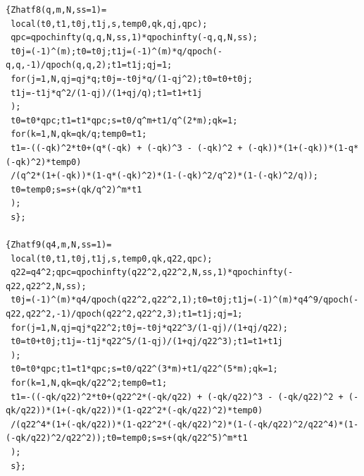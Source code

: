 \documentclass[pdftex]{sigma}
\numberwithin{equation}{section}
\begin{document}
\begin{lstlisting}
{Zhatf8(q,m,N,ss=1)=
 local(t0,t1,t0j,t1j,s,temp0,qk,qj,qpc);
 qpc=qpochinfty(q,q,N,ss,1)*qpochinfty(-q,q,N,ss);
 t0j=(-1)^(m);t0=t0j;t1j=(-1)^(m)*q/qpoch(-q,q,-1)/qpoch(q,q,2);t1=t1j;qj=1;
 for(j=1,N,qj=qj*q;t0j=-t0j*q/(1-qj^2);t0=t0+t0j;
 t1j=-t1j*q^2/(1-qj)/(1+qj/q);t1=t1+t1j
 );
 t0=t0*qpc;t1=t1*qpc;s=t0/q^m+t1/q^(2*m);qk=1;
 for(k=1,N,qk=qk/q;temp0=t1;
 t1=-((-qk)^2*t0+(q*(-qk) + (-qk)^3 - (-qk)^2 + (-qk))*(1+(-qk))*(1-q*(-qk)^2)*temp0)
 /(q^2*(1+(-qk))*(1-q*(-qk)^2)*(1-(-qk)^2/q^2)*(1-(-qk)^2/q));
 t0=temp0;s=s+(qk/q^2)^m*t1
 );
 s};

{Zhatf9(q4,m,N,ss=1)=
 local(t0,t1,t0j,t1j,s,temp0,qk,q22,qpc);
 q22=q4^2;qpc=qpochinfty(q22^2,q22^2,N,ss,1)*qpochinfty(-q22,q22^2,N,ss);
 t0j=(-1)^(m)*q4/qpoch(q22^2,q22^2,1);t0=t0j;t1j=(-1)^(m)*q4^9/qpoch(-q22,q22^2,-1)/qpoch(q22^2,q22^2,3);t1=t1j;qj=1;
 for(j=1,N,qj=qj*q22^2;t0j=-t0j*q22^3/(1-qj)/(1+qj/q22);
 t0=t0+t0j;t1j=-t1j*q22^5/(1-qj)/(1+qj/q22^3);t1=t1+t1j
 );
 t0=t0*qpc;t1=t1*qpc;s=t0/q22^(3*m)+t1/q22^(5*m);qk=1;
 for(k=1,N,qk=qk/q22^2;temp0=t1;
 t1=-((-qk/q22)^2*t0+(q22^2*(-qk/q22) + (-qk/q22)^3 - (-qk/q22)^2 + (-qk/q22))*(1+(-qk/q22))*(1-q22^2*(-qk/q22)^2)*temp0)
 /(q22^4*(1+(-qk/q22))*(1-q22^2*(-qk/q22)^2)*(1-(-qk/q22)^2/q22^4)*(1-(-qk/q22)^2/q22^2));t0=temp0;s=s+(qk/q22^5)^m*t1
 );
 s};


\end{lstlisting}
\end{document}
